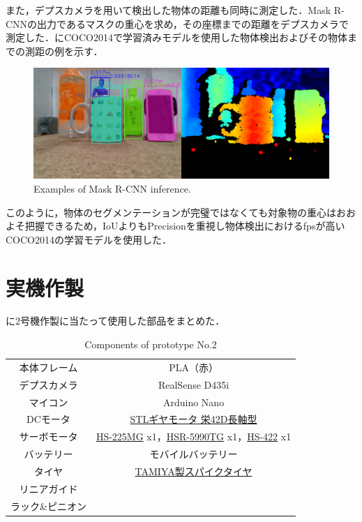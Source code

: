 また，デプスカメラを用いて検出した物体の距離も同時に測定した．Mask R-CNNの出力であるマスクの重心を求め，その座標までの距離をデプスカメラで測定した．にCOCO2014で学習済みモデルを使用した物体検出およびその物体までの測距の例を示す．

\begin{figure}[H]
    \centering
    \includegraphics[width=0.7\linewidth]{figure/chapter4/MaskR-CNN_screenshot}
    \caption{Examples of Mask R-CNN inference.}
    \label{fig:maskrcnn例}
\end{figure}

このように，物体のセグメンテーションが完璧ではなくても対象物の重心はおおよそ把握できるため，IoUよりもPrecisionを重視し物体検出におけるfpsが高いCOCO2014の学習モデルを使用した．


\section{実機作製}

に2号機作製に当たって使用した部品をまとめた．

\begin{table}[H]
    \centering
    \caption{Components of prototype No.2}
    \begin{tabular}{cc}\toprule
        本体フレーム & PLA（赤） \\
        デプスカメラ & RealSense D435i \\ 
        マイコン & Arduino Nano \\ 
        DCモータ & \href{http://akizukidenshi.com/catalog/g/gM-12379/}{STLギヤモータ 栄42D長軸型} \\ 
        サーボモータ & \href{https://hitecrcd.co.jp/products/servo32225/}{HS-225MG} x1，\href{https://hitecrcd.com/products/servos/discontinued-servos-servo-accessories/hsr-5990tg-hmi-ultra-premium-robot-servo/product}{HSR-5990TG} x1，\href{https://hitecrcd.co.jp/products/servo31422s/}{HS-422} x1 \\ 
        バッテリー & モバイルバッテリー \\ 
        タイヤ & \href{https://tamiya.com/japan/products/70194/index.html}{TAMIYA製スパイクタイヤ} \\
        リニアガイド &  \\
        ラック\&ピニオン &  \\ \bottomrule
    \end{tabular} 
    \label{tab:2号機部品}
\end{table}

